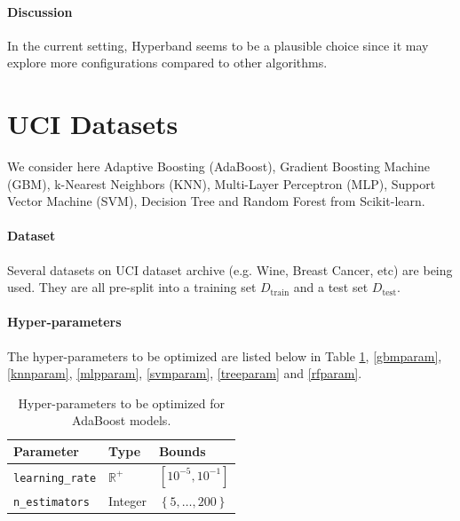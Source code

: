 \documentclass[runningheads,a4paper]{llncs}
\begin{document}
\paragraph{\textbf{Discussion}} In the current setting, Hyperband seems to be a plausible choice since it may explore more configurations compared to other algorithms.


\section{UCI Datasets}

We consider here Adaptive Boosting (AdaBoost), Gradient Boosting Machine (GBM), k-Nearest Neighbors (KNN), Multi-Layer Perceptron (MLP), Support Vector Machine (SVM), Decision Tree and Random Forest from Scikit-learn.

\paragraph{\textbf{Dataset}} Several datasets on UCI dataset archive (e.g. Wine, Breast Cancer, etc) are being used. They are all pre-split into a training set $D_{\operatorname{train}}$ and a test set $D_{\operatorname{test}}$.

\paragraph{\textbf{Hyper-parameters}} The hyper-parameters to be optimized are listed below in Table \ref{adaparam}, \ref{gbmparam},  \ref{knnparam}, \ref{mlpparam}, \ref{svmparam}, \ref{treeparam} and \ref{rfparam}.

\begin{table}[ht]
\centering
\begin{tabular}{@{}lll@{}}
\toprule
\textbf{Parameter}             & \textbf{Type}  & \textbf{Bounds}                          \\ \midrule
\texttt{learning\_rate}      & $\mathbb{R}^+$ & $\left[10^{-5}, 10^{-1}\right]$                         \\
\texttt{n\_estimators}       & Integer        & $\left\lbrace 5,\dots, 200 \right\rbrace$
\end{tabular}
\caption{Hyper-parameters to be optimized for AdaBoost models.}
\label{adaparam}
\end{table}
\end{document}

